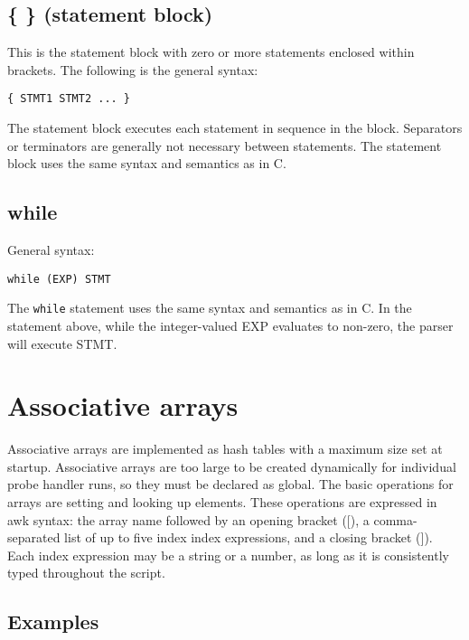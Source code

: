 \documentclass[twoside,english]{article}
\newenvironment{vindent}
{\begin{list}{}{\setlength{\listparindent}{6pt}}
\item[]}
{\end{list}}
\begin{document}
\subsection{\{ \} (statement block)}
\index{\{ \}}
This is the statement block with zero or more statements enclosed within
brackets. The following is the general syntax:

\begin{vindent}
\begin{verbatim}
{ STMT1 STMT2 ... }
\end{verbatim}
\end{vindent}
The statement block executes each statement in sequence in the block. Separators
or terminators are generally not necessary between statements. The statement
block uses the same syntax and semantics as in C.


\subsection{while}
General syntax:

\begin{vindent}
\begin{verbatim}
while (EXP) STMT
\end{verbatim}
\end{vindent}
The \texttt{while} statement uses the same syntax and semantics as in C.
In the statement above, while the integer-valued EXP evaluates to non-zero,
the parser will execute STMT. 


\section{Associative arrays\label{sec:Associative-Arrays}}
Associative arrays are implemented as hash tables with a maximum size set
at startup. Associative arrays are too large to be created dynamically for
individual probe handler runs, so they must be declared as global. The basic
operations for arrays are setting and looking up elements. These operations
are expressed in awk syntax: the array name followed by an opening bracket
({[}), a comma-separated list of up to five index index expressions, and
a closing bracket (]). Each index expression may be a string or a number,
as long as it is consistently typed throughout the script.


\subsection{Examples}
\end{document}
